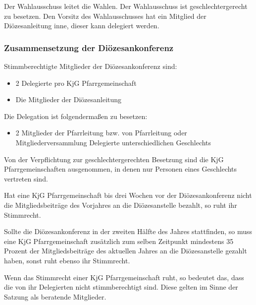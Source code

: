 \documentclass[12pt]{report}
\begin{document}
\begin{flushleft}
Der Wahlausschuss leitet die Wahlen. Der Wahlausschuss ist geschlechtergerecht zu besetzen. Den Vorsitz
des Wahlausschusses hat ein Mitglied der Diözesanleitung inne, dieser kann delegiert werden.

\subsubsection{Zusammensetzung der Diözesankonferenz}
Stimmberechtigte Mitglieder der Diözesankonferenz sind:
\begin{itemize}
  \item 2 Delegierte pro KjG Pfarrgemeinschaft
  \item Die Mitglieder der Diözesanleitung
\end{itemize}

Die Delegation ist folgendermaßen zu besetzen:
\begin{itemize}
  \item{ 2 Mitglieder der Pfarrleitung bzw. von Pfarrleitung oder Mitgliederversammlung
        Delegierte unterschiedlichen Geschlechts}
\end{itemize}

Von der Verpflichtung zur geschlechtergerechten Besetzung sind die KjG Pfarrgemeinschaften ausgenommen,
in denen nur Personen eines Geschlechts vertreten sind.

{\color{green}Hat eine KjG Pfarrgemeinschaft bis drei Wochen vor der Diözesankonferenz nicht die
Mitgliedsbeiträge des Vorjahres an die Diözesanstelle bezahlt, so ruht ihr Stimmrecht.

Sollte die Diözesankonferenz in der zweiten Hälfte des Jahres stattfinden, 
so muss eine KjG Pfarrgemeinschaft zusätzlich zum selben Zeitpunkt mindestens 35 Prozent der Mitgliedsbeiträge des aktuellen Jahres an die Diözesanstelle gezahlt haben,
sonst ruht ebenso ihr Stimmrecht.

Wenn das Stimmrecht einer KjG Pfarrgemeinschaft ruht, so bedeutet das, dass die von ihr Delegierten
nicht stimmberechtigt sind. Diese gelten im Sinne der Satzung als beratende Mitglieder.
\bigskip}


\end{flushleft}
\end{document}
